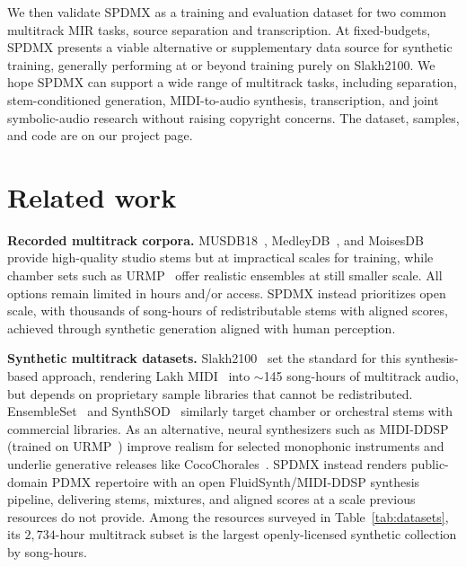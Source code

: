 \documentclass{article}
\begin{document}
We then validate SPDMX as a training and evaluation dataset for two common multitrack MIR tasks, source separation and transcription.
At fixed-budgets, SPDMX presents a viable alternative or supplementary data source for synthetic training, generally performing at or beyond training purely on Slakh2100.
We hope SPDMX can support a wide range of multitrack tasks, including separation, stem-conditioned generation, MIDI-to-audio synthesis, transcription, and joint symbolic-audio research without raising copyright concerns.
The dataset, samples, and code are on our project page.\footnotemark[1]

\section{Related work}
\label{sec:prior}

\noindent\textbf{Recorded multitrack corpora.}
MUSDB18~\cite{rafii2019musdb18}, MedleyDB~\cite{bittner2014medleydb,bittner2016medleydb}, and MoisesDB~\cite{pereira2023moisesdb} provide high-quality studio stems but at impractical scales for training, while chamber sets such as URMP~\cite{li2018creating} offer realistic ensembles at still smaller scale.
All options remain limited in hours and/or access.
SPDMX instead prioritizes open scale, with thousands of song-hours of redistributable stems with aligned scores, achieved through synthetic generation aligned with human perception.

\noindent\textbf{Synthetic multitrack datasets.}
Slakh2100~\cite{manilow2019cutting} set the standard for this synthesis-based approach, rendering Lakh MIDI~\cite{raffel2016learning} into $\sim$145 song-hours of multitrack audio, but depends on proprietary sample libraries that cannot be redistributed.
EnsembleSet~\cite{sarkar2022ensembleset} and SynthSOD~\cite{garcia2025synthsod} similarly target chamber or orchestral stems with commercial libraries.
As an alternative, neural synthesizers such as MIDI-DDSP~\cite{wu2022midi} (trained on URMP~\cite{li2018creating}) improve realism for selected monophonic instruments and underlie generative releases like CocoChorales~\cite{wu2022chamber}. 
SPDMX instead renders public-domain PDMX repertoire with an open FluidSynth/MIDI-DDSP synthesis pipeline, delivering stems, mixtures, and aligned scores at a scale previous resources do not provide.
Among the resources surveyed in Table~\ref{tab:datasets}, its $2{,}734$-hour multitrack subset is the largest openly-licensed synthetic collection by song-hours.
\end{document}
